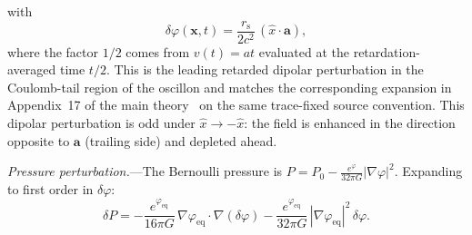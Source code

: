 \documentclass[aps,prd,onecolumn,superscriptaddress,nofootinbib,showpacs,12pt,notitlepage]{revtex4-2}
\newcommand{\rs}{r_{\mathrm{s}}}
\begin{document}
with
\begin{equation}\label{eq:delta_phi_accel}
  \delta\varphi(\mathbf{x},t)
  = \frac{\rs}{2c^{2}}\,(\hat{x}\cdot\mathbf{a}),
\end{equation}
where the factor $1/2$ comes from
$v(t) = at$ evaluated at the retardation-averaged time
$t/2$.  This is the leading retarded dipolar perturbation
in the Coulomb-tail region of the oscillon and matches the
corresponding expansion in Appendix~17 of the main
theory~\cite{Lotishvili2026}
on the same trace-fixed source convention.
This dipolar perturbation is odd under
$\hat{x} \to -\hat{x}$: the field is enhanced
in the direction opposite to $\mathbf{a}$ (trailing
side) and depleted ahead.

\textit{Pressure perturbation.}---The Bernoulli
pressure is
$P = P_{0} - \frac{e^{\varphi}}{32\pi G}
|\nabla\varphi|^{2}$.
Expanding to first order in $\delta\varphi$:
\begin{equation}\label{eq:P_asymmetry}
  \delta P
  = -\frac{e^{\varphi_{\mathrm{eq}}}}{16\pi G}\,
    \nabla\varphi_{\mathrm{eq}} \cdot
    \nabla\!\left(\delta\varphi\right)
  - \frac{e^{\varphi_{\mathrm{eq}}}}{32\pi G}\,
    |\nabla\varphi_{\mathrm{eq}}|^{2}\,
    \delta\varphi.
\end{equation}
\end{document}
